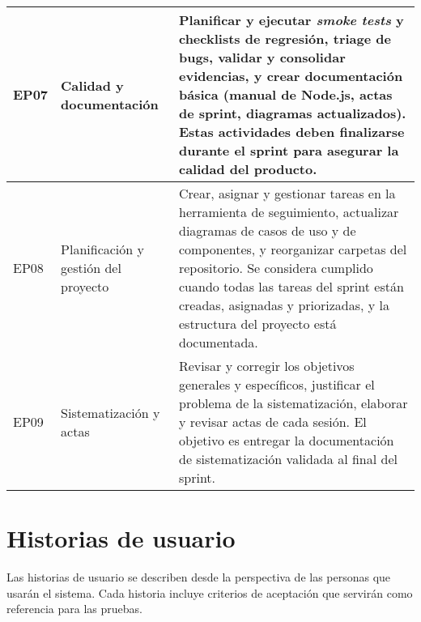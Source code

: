 \documentclass{article}
\begin{document}
\begin{longtable}{|p{}|p{}|p{}|}
\hline
EP07 & Calidad y documentaci\'on & Planificar y ejecutar \emph{smoke tests} y checklists de regresi\'on, triage de bugs, validar y consolidar evidencias, y crear documentaci\'on b\'asica (manual de Node.js, actas de sprint, diagramas actualizados). Estas actividades deben finalizarse durante el sprint para asegurar la calidad del producto. \\
\hline
EP08 & Planificaci\'on y gesti\'on del proyecto & Crear, asignar y gestionar tareas en la herramienta de seguimiento, actualizar diagramas de casos de uso y de componentes, y reorganizar carpetas del repositorio. Se considera cumplido cuando todas las tareas del sprint est\'an creadas, asignadas y priorizadas, y la estructura del proyecto est\'a documentada. \\
\hline
EP09 & Sistematizaci\'on y actas & Revisar y corregir los objetivos generales y espec\'ificos, justificar el problema de la sistematizaci\'on, elaborar y revisar actas de cada sesi\'on. El objetivo es entregar la documentaci\'on de sistematizaci\'on validada al final del sprint. \\
\hline
\end{longtable}

\section*{Historias de usuario}
Las historias de usuario se describen desde la perspectiva de las personas que usar\'an el sistema. Cada historia incluye criterios de aceptaci\'on que servir\'an como referencia para las pruebas.
\end{document}
